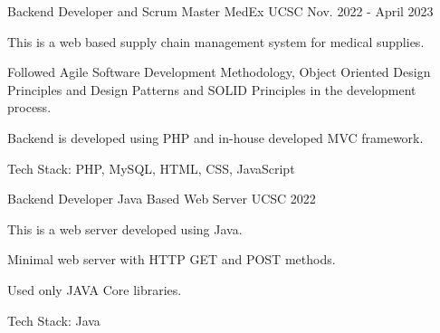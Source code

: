 \begin{cventries}
 \cventry
 {Backend Developer and Scrum Master} %
 {MedEx} %
 {UCSC} %
 {Nov. 2022 - April 2023} %
 {
   \begin{cvitems} %
     \item {This is a web based supply chain management system for medical supplies.}
     \item {Followed Agile Software Development Methodology, Object Oriented Design Principles and Design Patterns and SOLID Principles in the development process.}
     \item {Backend is developed using PHP and in-house developed MVC framework.}
     \item {Tech Stack: PHP, MySQL, HTML, CSS, JavaScript}
   \end{cvitems}
 }
 \cventry
 {Backend Developer} %
 {Java Based Web Server} %
 {UCSC} %
 {2022} %
 {
   \begin{cvitems} %
     \item {This is a web server developed using Java.}
     \item {Minimal web server with HTTP GET and POST methods.}
     \item {Used only JAVA Core libraries.}
     \item {Tech Stack: Java}
   \end{cvitems}
 }
\end{cventries}

